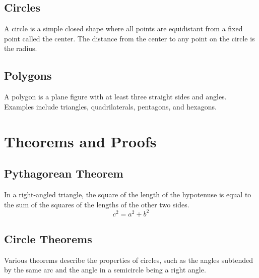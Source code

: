 \documentclass[a4paper,twoside,11pt]{book}
\begin{document}
\subsection{Circles}
A circle is a simple closed shape where all points are equidistant from a fixed point called the center. The distance from the center to any point on the circle is the radius.

\subsection{Polygons}
A polygon is a plane figure with at least three straight sides and angles. Examples include triangles, quadrilaterals, pentagons, and hexagons.

\section{Theorems and Proofs}
\subsection{Pythagorean Theorem}
In a right-angled triangle, the square of the length of the hypotenuse is equal to the sum of the squares of the lengths of the other two sides.
\[
c^2 = a^2 + b^2
\]

\subsection{Circle Theorems}
Various theorems describe the properties of circles, such as the angles subtended by the same arc and the angle in a semicircle being a right angle.
\end{document}

